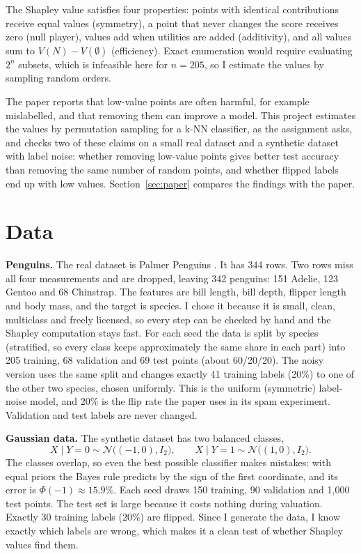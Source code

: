 \documentclass[10pt]{article}
\begin{document}
The Shapley value satisfies four properties: points with identical contributions receive equal values (symmetry), a point that never changes the score receives zero (null player), values add when utilities are added (additivity), and all values sum to $V(N)-V(\emptyset)$ (efficiency). Exact enumeration would require evaluating $2^n$ subsets, which is infeasible here for $n=205$, so I estimate the values by sampling random orders.

The paper reports that low-value points are often harmful, for example mislabelled, and that removing them can improve a model. This project estimates the values by permutation sampling for a k-NN classifier, as the assignment asks, and checks two of these claims on a small real dataset and a synthetic dataset with label noise: whether removing low-value points gives better test accuracy than removing the same number of random points, and whether flipped labels end up with low values. Section~\ref{sec:paper} compares the findings with the paper.

\section{Data}
\textbf{Penguins.} The real dataset is Palmer Penguins \citep{horst2020,gorman2014}. It has 344 rows. Two rows miss all four measurements and are dropped, leaving 342 penguins: 151 Adelie, 123 Gentoo and 68 Chinstrap. The features are bill length, bill depth, flipper length and body mass, and the target is species. I chose it because it is small, clean, multiclass and freely licensed, so every step can be checked by hand and the Shapley computation stays fast. For each seed the data is split by species (stratified, so every class keeps approximately the same share in each part) into 205 training, 68 validation and 69 test points (about 60/20/20). The noisy version uses the same split and changes exactly 41 training labels (20\%) to one of the other two species, chosen uniformly. This is the uniform (symmetric) label-noise model, and 20\% is the flip rate the paper uses in its spam experiment. Validation and test labels are never changed.

\textbf{Gaussian data.} The synthetic dataset has two balanced classes,
\[
X\mid Y=0\sim\mathcal{N}\big((-1,0),I_2\big),\qquad X\mid Y=1\sim\mathcal{N}\big((1,0),I_2\big).
\]
The classes overlap, so even the best possible classifier makes mistakes: with equal priors the Bayes rule predicts by the sign of the first coordinate, and its error is $\Phi(-1)\approx 15.9\%$. Each seed draws 150 training, 90 validation and 1,000 test points. The test set is large because it costs nothing during valuation. Exactly 30 training labels (20\%) are flipped. Since I generate the data, I know exactly which labels are wrong, which makes it a clean test of whether Shapley values find them.
\end{document}
